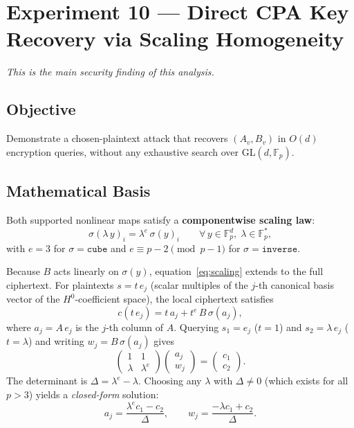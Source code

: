 \documentclass[12pt,a4paper]{article}
\theoremstyle{definition}
\newcommand{\Fp}{\mathbb{F}_p}
\newcommand{\GL}{\mathrm{GL}}
\begin{document}
\section{Experiment 10 --- Direct CPA Key Recovery via Scaling Homogeneity}

\textit{This is the main security finding of this analysis.}

\subsection{Objective}

Demonstrate a chosen-plaintext attack that recovers $(A_v, B_v)$
in $O(d)$ encryption queries, without any exhaustive search over
$\GL(d, \Fp)$.

\subsection{Mathematical Basis}
\label{sub:scaling}

Both supported nonlinear maps satisfy a \textbf{componentwise scaling
law}:
\begin{equation}\label{eq:scaling}
  \sigma(\lambda\, y)_i = \lambda^e\, \sigma(y)_i
  \qquad \forall\, y \in \Fp^d,\; \lambda \in \Fp^*,
\end{equation}
with $e = 3$ for $\sigma = \texttt{cube}$ and $e \equiv p-2 \pmod{p-1}$
for $\sigma = \texttt{inverse}$.

Because $B$ acts linearly on $\sigma(y)$, equation~\eqref{eq:scaling}
extends to the full ciphertext. For plaintexts $s = t\,e_j$
(scalar multiples of the $j$-th canonical basis vector of the
$H^0$-coefficient space), the local ciphertext satisfies
\begin{equation}\label{eq:pair}
  c(t\,e_j) = t\,a_j + t^e\,B\,\sigma(a_j),
\end{equation}
where $a_j = A\,e_j$ is the $j$-th column of $A$.
Querying $s_1 = e_j$ ($t = 1$) and $s_2 = \lambda\,e_j$
($t = \lambda$) and writing $w_j = B\,\sigma(a_j)$ gives
\begin{equation}\label{eq:2x2}
  \begin{pmatrix} 1 & 1 \\ \lambda & \lambda^e \end{pmatrix}
  \begin{pmatrix} a_j \\ w_j \end{pmatrix}
  = \begin{pmatrix} c_1 \\ c_2 \end{pmatrix}.
\end{equation}
The determinant is $\Delta = \lambda^e - \lambda$. Choosing any
$\lambda$ with $\Delta \neq 0$ (which exists for all $p > 3$) yields
a \emph{closed-form} solution:
\begin{equation}\label{eq:solution}
  a_j = \frac{\lambda^e c_1 - c_2}{\Delta}, \qquad
  w_j = \frac{-\lambda c_1 + c_2}{\Delta}.
\end{equation}
\end{document}

